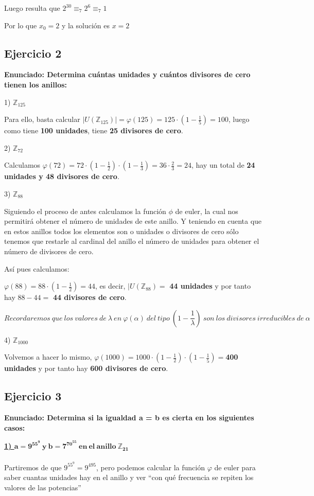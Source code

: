\documentclass[11pt, a4paper, titlepage]{article}
\providecommand{\ent}{\mathbb{Z}}
\begin{document}
Luego resulta que $2^{30}\equiv_7 2^6 \equiv_7 1$

Por lo que $x_0 = 2$ y la solución es $x=2$


\subsection{\LARGE{Ejercicio 2}}

\textbf{Enunciado: Determina cuántas unidades y cuántos divisores de cero tienen los anillos:}

1) $\ent_{125}$

Para ello, basta calcular $|U(\ent_{125})| = \varphi(125) = 125 \cdot(1-\frac{1}{5}) = 100$, luego como tiene \textbf{100 unidades}, tiene \textbf{25 divisores de cero}.

2) $\ent_{72}$

Calculamos $\varphi(72) = 72\cdot(1-\frac{1}{2})\cdot(1-\frac{1}{3}) = 36\cdot \frac{2}{3} = 24$, hay un total de \textbf{24 unidades y 48 divisores de cero}.


3) $\ent_{88}$

Siguiendo el proceso de antes calculamos la función $\phi$ de euler, la cual nos permitirá obtener el número de unidades de este anillo.
Y teniendo en cuenta que en estos anillos todos los elementos son o unidades o divisores de cero sólo tenemos que restarle al cardinal del anillo el número de unidades para obtener el número de divisores de cero.

Así pues calculamos:

$\varphi(88) = 88\cdot(1-\frac{1}{2}) = 44$, es decir, $|U(\ent_{88}) =$ \textbf{44 unidades} y por tanto hay $88-44=$ \textbf{44 divisores de cero}.

$$Recordaremos\ que\ los\ valores\ de\ \lambda\ en\ \varphi(\alpha)\ del\ tipo\ (1-\frac{1}{\lambda})\ son\ los\ divisores\ irreducibles\ de\ \alpha$$


4) $\ent_{1000}$

Volvemos a hacer lo mismo, $\varphi(1000) = 1000\cdot(1-\frac{1}{2})\cdot(1-\frac{1}{5}) = $\textbf{400 unidades} y por tanto hay \textbf{600 divisores de cero}.

\subsection{\LARGE{Ejercicio 3}}

\textbf{Enunciado: Determina si la igualdad a = b es cierta en los siguientes casos:}

\textbf{\underline{1) $\mathbf{a = 9^{55^9}\ y\ b = 7^{70^{55}}\ en\ el\ anillo\ \ent_{21} }$}}
\\\\ 
Partiremos de que $9^{55^9} = 9^{495}$, pero podemos calcular la función $\varphi$ de euler para saber cuantas unidades hay en el anillo y ver “con qué frecuencia se repiten los valores de las potencias”
\end{document}
